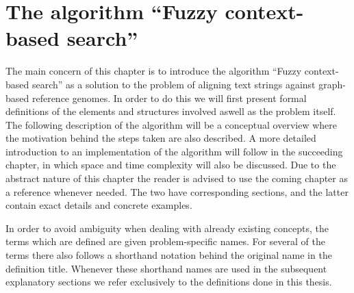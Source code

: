 \documentclass[thesis.tex]{subfiles}
\begin{document}
\chapter{The algorithm ``Fuzzy context-based search''}
{\parindent0pt
The main concern of this chapter is to introduce the algorithm ``Fuzzy context-based search'' as a solution to the problem of aligning text strings against graph-based reference genomes. In order to do this we will first present formal definitions of the elements and structures involved aswell as the problem itself. The following description of the algorithm will be a conceptual overview where the motivation behind the steps taken are also described. A more detailed introduction to an implementation of the algorithm will follow in the succeeding chapter, in which space and time complexity will also be discussed. Due to the abstract nature of this chapter the reader is advised to use the coming chapter as a reference whenever needed. The two have corresponding sections, and the latter contain exact details and concrete examples.\\
\par\noindent
In order to avoid ambiguity when dealing with already existing concepts, the terms which are defined are given problem-specific names. For several of the terms there also follows a shorthand notation behind the original name in the definition title. Whenever these shorthand names are used in the subsequent explanatory sections we refer exclusively to the definitions done in this thesis.
}
\end{document}
